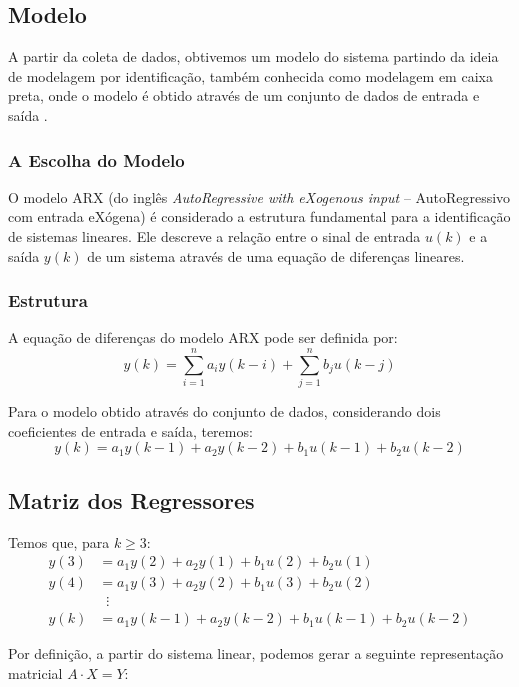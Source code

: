 \documentclass[twocolumn,10pt]{article}
\begin{document}
\subsection{Modelo}
A partir da coleta de dados, obtivemos um modelo do sistema partindo da ideia de modelagem por identificação, também conhecida como modelagem em caixa preta, onde o modelo é obtido através de um conjunto de dados de entrada e saída \cite{aguirre2015introducao}.

\subsubsection{A Escolha do Modelo}
O modelo ARX (do inglês \textit{AutoRegressive with eXogenous input} -- AutoRegressivo com entrada eXógena) é considerado a estrutura fundamental para a identificação de sistemas lineares. Ele descreve a relação entre o sinal de entrada $u(k)$ e a saída $y(k)$ de um sistema através de uma equação de diferenças lineares.

\subsubsection{Estrutura}
A equação de diferenças do modelo ARX pode ser definida por:
\begin{equation}
y(k) = \sum_{i=1}^{n} a_i y(k-i) + \sum_{j=1}^{n} b_j u(k-j)
\end{equation}

Para o modelo obtido através do conjunto de dados, considerando dois coeficientes de entrada e saída, teremos:
\begin{equation}
y(k) = a_1 y(k-1) + a_2 y(k-2) + b_1 u(k-1) + b_2 u(k-2)
\end{equation}

\subsection{Matriz dos Regressores}
Temos que, para $k \ge 3$:
\begin{align*}
y(3) &= a_1 y(2) + a_2 y(1) + b_1 u(2) + b_2 u(1) \\
y(4) &= a_1 y(3) + a_2 y(2) + b_1 u(3) + b_2 u(2) \\
&\;\;\vdots \\
y(k) &= a_1 y(k-1) + a_2 y(k-2) + b_1 u(k-1) + b_2 u(k-2)
\end{align*}

Por definição, a partir do sistema linear, podemos gerar a seguinte representação matricial $A \cdot X = Y$:
\end{document}
